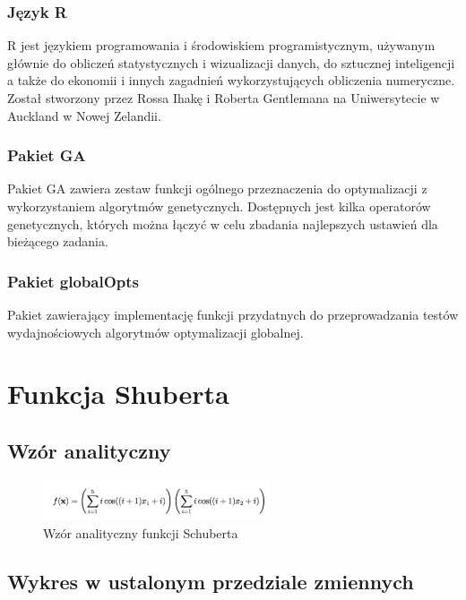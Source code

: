 \documentclass{article}
\begin{document}
\subsubsection{Język R}
R jest językiem programowania i środowiskiem programistycznym, używanym głównie do obliczeń statystycznych i wizualizacji danych, do sztucznej inteligencji a także do ekonomii i innych zagadnień wykorzystujących obliczenia numeryczne. Został stworzony przez Rossa Ihakę i Roberta Gentlemana na Uniwersytecie w Auckland w Nowej Zelandii. 


\subsubsection{Pakiet GA}

Pakiet GA zawiera zestaw funkcji ogólnego przeznaczenia do optymalizacji z wykorzystaniem algorytmów genetycznych. Dostępnych jest kilka operatorów genetycznych, których można łączyć w celu zbadania najlepszych ustawień dla bieżącego zadania.


\subsubsection{Pakiet globalOpts}
Pakiet zawierający implementację funkcji przydatnych do przeprowadzania testów wydajnościowych algorytmów optymalizacji globalnej.


\clearpage
\section{Funkcja Shuberta}
	\subsection{Wzór analityczny}
	   \begin{figure}[!htbp]
    \centering
    \includegraphics[width=0.6\textwidth]{inc/wzory/schubert}
     \caption{Wzór analityczny funkcji Schuberta}
    \end{figure}
    
    
 
    
    
    \subsection{Wykres w ustalonym przedziale zmiennych}
    
\end{document}
